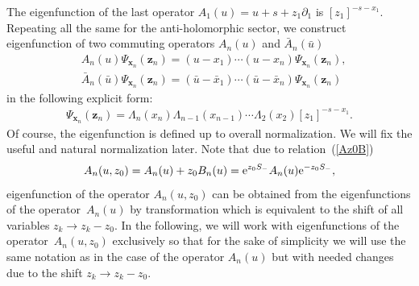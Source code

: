 \documentclass[pdftex]{sigma}
\numberwithin{equation}{section}
\begin{document}
The eigenfunction of the last operator
$A_{1}(u) = u+s+z_1\partial_1$ is $[z_1]^{-s-x_1}$.
Repeating all the same for the anti-holomorphic
sector, we construct eigenfunction of two commuting
operators $A_n(u)$ and $\bar{A}_n(\bar{u})$
\begin{align}
&A_n(u)
\Psi_{\bm{x}_n}(\bm z_n)= (u-x_1)\cdots(u-x_n)
\Psi_{\bm{x}_n}(\bm z_n),
\nonumber\\
&\bar{A}_n(\bar{u})
\Psi_{\bm{x}_n}(\bm z_n)= (\bar u-\bar x_1)\cdots(\bar u-\bar x_n)
 \Psi_{\bm{x}_n}(\bm z_n)\label{APsi}
\end{align}
in the following explicit form:
\begin{align*}
\Psi_{\bm{x}_n}(\bm z_n) =
\Lambda_n( x_n)
\Lambda_{n-1}( x_{n-1})\cdots
\Lambda_{2}( x_{2}) [z_1]^{-s-x_1} .
\end{align*}
Of course, the eigenfunction is defined up to overall
normalization. We will fix the useful and natural normalization later.
Note that due to relation~(\ref{Az0B})
\begin{align*}
A_n(u,z_0) = A_n(u)+z_0 B_n(u) = {\rm e}^{z_0 S_{-}} A_n(u) {\rm e}^{-z_0 S_{-}},
\end{align*}
eigenfunction of the
operator $A_n(u,z_0)$ can be obtained from the eigenfunctions
of the operator~$A_n(u)$ by transformation
which is equivalent to the shift of all variables $z_k\to z_k-z_0$.
In the following, we will work with eigenfunctions of the operator~$A_n(u,z_0)$
exclusively so that for the sake of simplicity we
will use the same notation as in the case of the operator $A_n(u)$
but with needed changes due to the shift $z_k\to z_k-z_0$.
\end{document}

